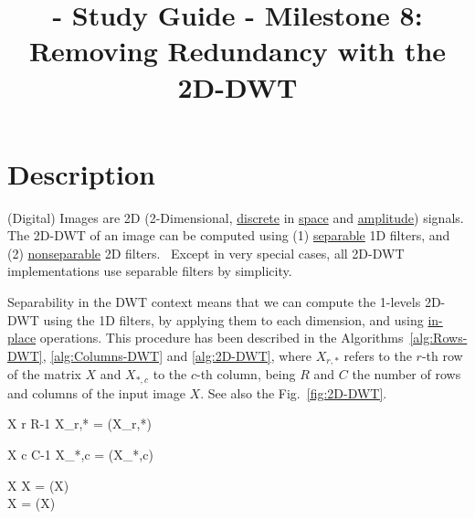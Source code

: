 
\title{\SM{} - Study Guide - Milestone 8: Removing Redundancy with the 2D-DWT}

\maketitle

\tableofcontents

\section{Description}

(Digital) Images are 2D (2-Dimensional,
\href{https://en.wikipedia.org/wiki/Discrete_time_and_continuous_time}{discrete}
in \href{https://en.wikipedia.org/wiki/Space}{space} and
\href{https://en.wikipedia.org/wiki/Amplitude}{amplitude})
signals. The 2D-DWT of an image can be computed using (1)
\href{https://en.wikipedia.org/wiki/Separable_filter}{separable} 1D
filters, and (2)
\href{https://en.wikipedia.org/wiki/Non-separable_wavelet}{nonseparable}
2D filters.~\cite{sayood2017introduction} Except in very special
cases, all 2D-DWT implementations use separable filters by simplicity.

Separability in the DWT context means that we can compute the 1-levels
2D-DWT using the 1D filters, by applying them to each dimension, and
using
\href{https://en.wikipedia.org/wiki/In-place_algorithm}{in-place}
operations. This procedure has been described in the
Algorithms~\ref{alg:Rows-DWT}, \ref{alg:Columns-DWT} and
\ref{alg:2D-DWT}, where $X_{r,*}$ refers to the $r$-th row of the
matrix $X$ and $X_{*,c}$ to the $c$-th column, being $R$ and $C$ the
number of rows and columns of the input image $X$. See also the
Fig.~\ref{fig:2D-DWT}.

\begin{pseudocode}{}{X}
  \label{alg:Rows-DWT}
  \FOR r  \TO R-1 \DO
  X_{r,*} = (X_{r,*})\\
\end{pseudocode}

\begin{pseudocode}{}{X}
  \label{alg:Columns-DWT}
  \FOR c  \TO C-1 \DO
  X_{*,c} = (X_{*,c})\\
\end{pseudocode}

\begin{pseudocode}{}{X}
  \label{alg:2D-DWT}
  X = (X)\\
  X = (X)\\
\end{pseudocode}

